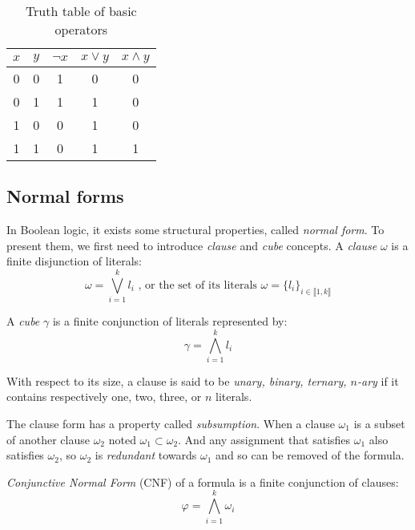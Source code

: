 \begin{table}[!htbp]
	\centering
	\begin{tabular}{cc|ccc}
		$x$ & $y$ & $\neg x$ & $x \lor y$ & $x \land y$ \\
		\toprule
		0 & 0 & 1 & 0 & 0 \\
		\midrule
		0 & 1 & 1 & 1 & 0 \\
		\midrule
		1 & 0 & 0 & 1 & 0 \\
		\midrule
		1 & 1 & 0 & 1 & 1 \\
		\bottomrule
	\end{tabular}
	\caption{Truth table of basic operators}
	\label{tab:truthtable}
\end{table}

\subsection{Normal forms}
In Boolean logic, it exists some structural properties, called \emph{normal form}.
To present them, we first need to introduce \emph{clause} and \emph{cube} concepts.
A \emph{clause} $\omega$ is a finite disjunction of literals:
$$\omega = \bigvee_{i=1}^k l_i \text{ , or the set of its literals } \omega = \{l_i\}_{i \in \llbracket 1,k \rrbracket}$$
 
A \emph{cube} $\gamma$ is a finite conjunction of literals represented by:
$$\gamma = \bigwedge_{i=1}^k l_i$$

With respect to its size, a clause is said to be \emph{unary, binary, ternary, $n$-ary} if it contains respectively one, two, three, or $n$ literals.

The clause form has a property called \emph{subsumption}. 
When a clause $\omega_1$ is a subset of another clause $\omega_2$ noted $\omega_1 \subset \omega_2$. And any 
assignment that satisfies $\omega_1$ also satisfies $\omega_2$, so $\omega_2$ is \emph{redundant} towards $\omega_1$ and so can be removed of the formula.

\emph{Conjunctive Normal Form} (CNF) of a formula is a finite conjunction of clauses:
  $$\varphi = \bigwedge_{i=1}^k \omega_i$$
  
